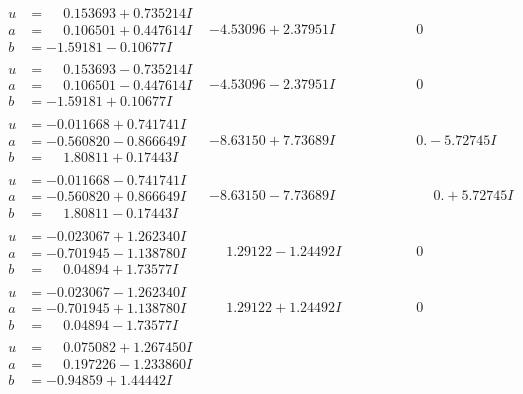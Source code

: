 \documentclass[1p]{elsarticle_modified}
\theoremstyle{definition}
\begin{document}
$$\begin{array}{c|c|c}
\begin{aligned}
u &= \phantom{-}0.153693 + 0.735214 I \\
a &= \phantom{-}0.106501 + 0.447614 I \\
b &= -1.59181 - 0.10677 I\end{aligned}
 & -4.53096 + 2.37951 I & \phantom{-0.000000 } 0 \\ \hline\begin{aligned}
u &= \phantom{-}0.153693 - 0.735214 I \\
a &= \phantom{-}0.106501 - 0.447614 I \\
b &= -1.59181 + 0.10677 I\end{aligned}
 & -4.53096 - 2.37951 I & \phantom{-0.000000 } 0 \\ \hline\begin{aligned}
u &= -0.011668 + 0.741741 I \\
a &= -0.560820 - 0.866649 I \\
b &= \phantom{-}1.80811 + 0.17443 I\end{aligned}
 & -8.63150 + 7.73689 I & \phantom{-0.000000 } 0. - 5.72745 I \\ \hline\begin{aligned}
u &= -0.011668 - 0.741741 I \\
a &= -0.560820 + 0.866649 I \\
b &= \phantom{-}1.80811 - 0.17443 I\end{aligned}
 & -8.63150 - 7.73689 I & \phantom{-0.000000 -}0. + 5.72745 I \\ \hline\begin{aligned}
u &= -0.023067 + 1.262340 I \\
a &= -0.701945 - 1.138780 I \\
b &= \phantom{-}0.04894 + 1.73577 I\end{aligned}
 & \phantom{-}1.29122 - 1.24492 I & \phantom{-0.000000 } 0 \\ \hline\begin{aligned}
u &= -0.023067 - 1.262340 I \\
a &= -0.701945 + 1.138780 I \\
b &= \phantom{-}0.04894 - 1.73577 I\end{aligned}
 & \phantom{-}1.29122 + 1.24492 I & \phantom{-0.000000 } 0 \\ \hline\begin{aligned}
u &= \phantom{-}0.075082 + 1.267450 I \\
a &= \phantom{-}0.197226 - 1.233860 I \\
b &= -0.94859 + 1.44442 I\end{aligned}

\end{array}$$
\end{document}
